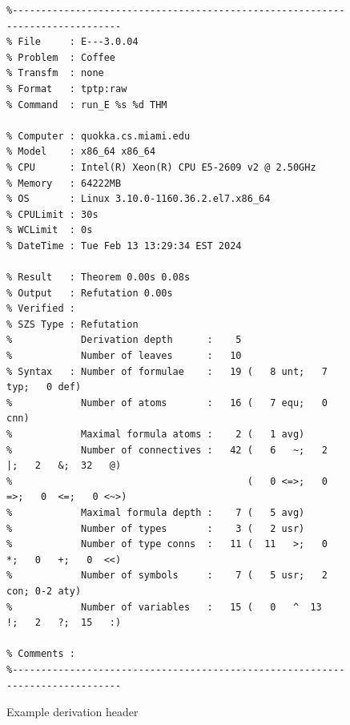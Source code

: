 \documentclass[runningheads]{llncs}
\begin{document}
\begin{figure}[htb]
\centering
{\scriptsize
{\setlength{\baselineskip}{2.5mm}
\begin{verbatim}
%------------------------------------------------------------------------------
% File     : E---3.0.04
% Problem  : Coffee 
% Transfm  : none
% Format   : tptp:raw
% Command  : run_E %s %d THM

% Computer : quokka.cs.miami.edu
% Model    : x86_64 x86_64
% CPU      : Intel(R) Xeon(R) CPU E5-2609 v2 @ 2.50GHz
% Memory   : 64222MB
% OS       : Linux 3.10.0-1160.36.2.el7.x86_64
% CPULimit : 30s
% WCLimit  : 0s
% DateTime : Tue Feb 13 13:29:34 EST 2024

% Result   : Theorem 0.00s 0.08s
% Output   : Refutation 0.00s
% Verified :
% SZS Type : Refutation
%            Derivation depth      :    5
%            Number of leaves      :   10
% Syntax   : Number of formulae    :   19 (   8 unt;   7 typ;   0 def)
%            Number of atoms       :   16 (   7 equ;   0 cnn)
%            Maximal formula atoms :    2 (   1 avg)
%            Number of connectives :   42 (   6   ~;   2   |;   2   &;  32   @)
%                                         (   0 <=>;   0  =>;   0  <=;   0 <~>)
%            Maximal formula depth :    7 (   5 avg)
%            Number of types       :    3 (   2 usr)
%            Number of type conns  :   11 (  11   >;   0   *;   0   +;   0  <<)
%            Number of symbols     :    7 (   5 usr;   2 con; 0-2 aty)
%            Number of variables   :   15 (   0   ^  13   !;   2   ?;  15   :)

% Comments :
%------------------------------------------------------------------------------
\end{verbatim}
}}
\caption{Example derivation header}
\label{ExampleDerivationHeader}
\end{figure}

\end{document}
